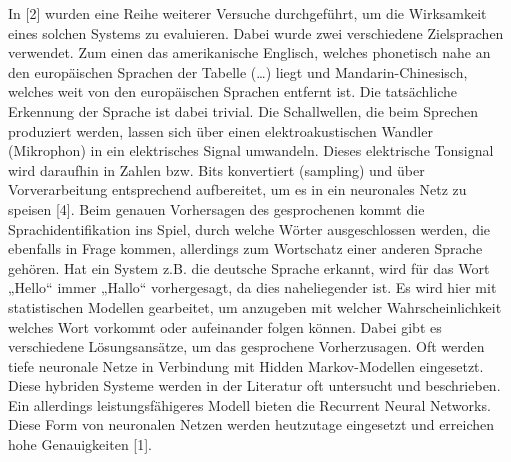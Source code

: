 In [2] wurden eine Reihe weiterer Versuche durchgeführt, um die Wirksamkeit eines solchen Systems zu evaluieren. Dabei wurde zwei verschiedene Zielsprachen verwendet. Zum einen das amerikanische Englisch, welches phonetisch nahe an den europäischen Sprachen der Tabelle (…) liegt und Mandarin-Chinesisch, welches weit von den europäischen Sprachen entfernt ist. 
Die tatsächliche Erkennung der Sprache ist dabei trivial. Die Schallwellen, die beim Sprechen produziert werden, lassen sich über einen elektroakustischen Wandler (Mikrophon) in ein elektrisches Signal umwandeln. Dieses elektrische Tonsignal wird daraufhin in Zahlen bzw. Bits konvertiert (sampling) und über Vorverarbeitung entsprechend aufbereitet, um es in ein neuronales Netz zu speisen [4]. Beim genauen Vorhersagen des gesprochenen kommt die Sprachidentifikation ins Spiel, durch welche Wörter ausgeschlossen werden, die ebenfalls in Frage kommen, allerdings zum Wortschatz einer anderen Sprache gehören. Hat ein System z.B. die deutsche Sprache erkannt, wird für das Wort „Hello“ immer „Hallo“ vorhergesagt, da dies naheliegender ist. Es wird hier mit statistischen Modellen gearbeitet, um anzugeben mit welcher Wahrscheinlichkeit welches Wort vorkommt oder aufeinander folgen können. Dabei gibt es verschiedene Lösungsansätze, um das gesprochene Vorherzusagen. Oft werden tiefe neuronale Netze in Verbindung mit Hidden Markov-Modellen eingesetzt. Diese hybriden Systeme werden in der Literatur oft untersucht und beschrieben. Ein allerdings leistungsfähigeres Modell bieten die Recurrent Neural Networks. Diese Form von neuronalen Netzen werden heutzutage eingesetzt und erreichen hohe Genauigkeiten [1].


